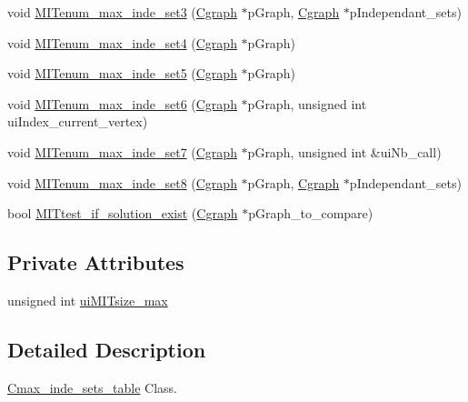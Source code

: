 \begin{DoxyCompactItemize}
\item 
void \hyperlink{class_cmax__inde__sets__table_a4443b25faed663d6f2011d41edc30594}{M\+I\+Tenum\+\_\+max\+\_\+inde\+\_\+set3} (\hyperlink{class_cgraph}{Cgraph} $\ast$p\+Graph, \hyperlink{class_cgraph}{Cgraph} $\ast$p\+Independant\+\_\+sets)
\item 
void \hyperlink{class_cmax__inde__sets__table_ac97e4ba5939dd8a72c737ea4416997e2}{M\+I\+Tenum\+\_\+max\+\_\+inde\+\_\+set4} (\hyperlink{class_cgraph}{Cgraph} $\ast$p\+Graph)
\item 
void \hyperlink{class_cmax__inde__sets__table_a43c8f03646bb044c746b1129d5cb140d}{M\+I\+Tenum\+\_\+max\+\_\+inde\+\_\+set5} (\hyperlink{class_cgraph}{Cgraph} $\ast$p\+Graph)
\item 
void \hyperlink{class_cmax__inde__sets__table_a4945d82e35a9349f3299cf052e8454b1}{M\+I\+Tenum\+\_\+max\+\_\+inde\+\_\+set6} (\hyperlink{class_cgraph}{Cgraph} $\ast$p\+Graph, unsigned int ui\+Index\+\_\+current\+\_\+vertex)
\item 
void \hyperlink{class_cmax__inde__sets__table_a473fad0ec6d5bf2d03f4d2fc12ef8330}{M\+I\+Tenum\+\_\+max\+\_\+inde\+\_\+set7} (\hyperlink{class_cgraph}{Cgraph} $\ast$p\+Graph, unsigned int \&ui\+Nb\+\_\+call)
\item 
void \hyperlink{class_cmax__inde__sets__table_ad02bc25918d717f721f9529836fa3a0a}{M\+I\+Tenum\+\_\+max\+\_\+inde\+\_\+set8} (\hyperlink{class_cgraph}{Cgraph} $\ast$p\+Graph, \hyperlink{class_cgraph}{Cgraph} $\ast$p\+Independant\+\_\+sets)
\item 
bool \hyperlink{class_cmax__inde__sets__table_ad6debe47c6f898406574908a34be3cc0}{M\+I\+Ttest\+\_\+if\+\_\+solution\+\_\+exist} (\hyperlink{class_cgraph}{Cgraph} $\ast$p\+Graph\+\_\+to\+\_\+compare)
\end{DoxyCompactItemize}
\subsection*{Private Attributes}
\begin{DoxyCompactItemize}
\item 
unsigned int \hyperlink{class_cmax__inde__sets__table_a9a847269f6dfaca3ce1c292fc31171cf}{ui\+M\+I\+Tsize\+\_\+max}
\end{DoxyCompactItemize}


\subsection{Detailed Description}
\hyperlink{class_cmax__inde__sets__table}{Cmax\+\_\+inde\+\_\+sets\+\_\+table} Class. 

